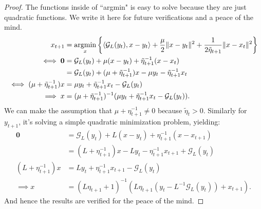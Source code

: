 \documentclass[12pt]{article}
\begin{document}
    \begin{proof}
        The functions inside of ``argmin" is easy to solve because they are just quadratic functions. 
        We write it here for future verifications and a peace of the mind. 
        \begin{align*}
            x_{t + 1} &= \mathop{\rm argmin}\limits_{x}\left\lbrace
                \langle \mathcal G_L(y_t), x - y_t\rangle 
                + 
                \frac{\mu}{2}\Vert x - y_t\Vert^2 +  
                \frac{1}{2\tilde \eta_{t + 1}}\Vert x - x_t\Vert^2
            \right\rbrace
            \\
            \iff 
            \mathbf 0 & = 
            \mathcal G_L(y_t) + \mu(x - y_t) + \tilde \eta_{t + 1}^{-1}(x - x_t)
            \\
            &= 
            \mathcal G_L(y_t) + (\mu + \tilde \eta_{t + 1}^{-1}) x - \mu y_t - \tilde \eta_{t + 1}^{-1} x_t
            \\
            \iff 
            (\mu + \tilde \eta_{t + 1}^{-1})x 
            &= 
            \mu y_t + \tilde \eta_{t + 1}^{-1} x_t - \mathcal G_L(y_t)
            \\
            \implies 
            x &= (\mu + \tilde \eta_{t + 1}^{-1})^{-1 }
            (\mu y_t + \tilde \eta_{t + 1}^{-1} x_t - \mathcal G_L(y_t)). 
        \end{align*}
        We can make the assumption that $\mu + \eta_{t + 1}^{-1} \neq 0$ because $\tilde\eta_t > 0$. 
        Similarly for $y_{t + 1}$, it's solving a simple quadratic minimization problem, yielding: 
        \begin{align*}
            \mathbf 0 &= \mathcal G_L(y_t) + L(x - y_t) + \eta_{t + 1}^{-1}(x - x_{t + 1})
            \\
            &= (L + \eta_{t + 1}^{-1})x - L y_t - \eta_{t + 1}^{-1}x_{t + 1} + \mathcal G_L(y_t) 
            \\
            (L + \eta_{t + 1}^{-1})x &= 
            Ly_t + \eta_{t + 1}^{-1} x_{t + 1} - \mathcal G_L(y_t)
            \\
            \implies 
            x &= 
            (L\eta_{t + 1} + 1)^{-1}(L\eta_{t + 1}(y_t - L^{-1}\mathcal G_L(y_t)) + x_{t + 1}). 
        \end{align*}
        And hence the results are verified for the peace of the mind. 
    \end{proof}
\end{document}
